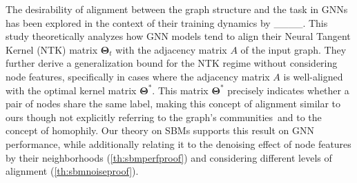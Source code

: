 The desirability of alignment between the graph structure and the task in GNNs has been explored in the context of their training dynamics by ____. This study theoretically analyzes how GNN models tend to align their Neural Tangent Kernel (NTK) matrix $\mathbf{\Theta}_t$ with the adjacency matrix $A$ of the input graph. 
They further derive a generalization bound for the NTK regime without considering node features, specifically in cases where the adjacency matrix $A$ is well-aligned with the optimal kernel matrix $\mathbf{\Theta}^*$. 
This matrix $\mathbf{\Theta}^*$ precisely indicates whether a pair of nodes share the same label, making this concept of alignment similar to ours \textemdash though not explicitly referring to the graph's communities\textemdash~and to the concept of homophily. 
Our theory on SBMs supports this result on GNN performance, while additionally relating it to the denoising effect of node features by their neighborhoods (\autoref{th:sbmperfproof}) and considering different levels of alignment (\autoref{th:sbmnoiseproof}).